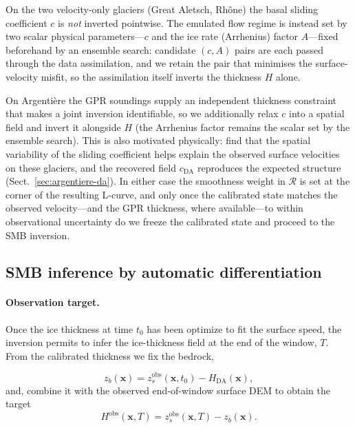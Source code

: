 On the two velocity-only glaciers (Great Aletsch, Rhône) the basal sliding
coefficient $c$ is \emph{not} inverted pointwise. The emulated flow regime is
instead set by two scalar physical parameters---$c$ and the ice rate (Arrhenius)
factor $A$---fixed beforehand by an ensemble search: candidate $(c, A)$ pairs are
each passed through the data assimilation, and we retain the pair that minimises the
surface-velocity misfit, so the assimilation itself inverts the thickness $H$ alone.

On Argentière the GPR soundings supply an independent thickness constraint that
makes a joint inversion identifiable, so we additionally relax $c$ into a spatial
field and invert it alongside $H$ (the Arrhenius factor remains the scalar set by
the ensemble search). This is also motivated physically: \citet{kneib2024} find that
the spatial variability of the sliding coefficient helps explain the observed
surface velocities on these glaciers, and the recovered field $c_{\mathrm{DA}}$
reproduces the expected structure (Sect.~\ref{sec:argentiere-da}). In either case
the smoothness weight in $\mathcal{R}$ is set at the corner of the resulting L-curve,
and only once the calibrated state matches the observed velocity---and the GPR
thickness, where available---to within observational uncertainty do we freeze the
calibrated state and proceed to the SMB inversion.

\subsection{SMB inference by automatic differentiation}\label{sec:inference}

\paragraph{Observation target.}
Once the ice thickness at time $t_0$ has been optimize to fit the surface speed, the inversion permits to infer the ice-thickness field at the
end of the window, $T$. From the calibrated thickness we fix the bedrock,

\begin{equation}
  z_b(\mathbf{x}) = z_s^{\mathrm{obs}}(\mathbf{x}, t_0) - H_{\mathrm{DA}}(\mathbf{x}),
  \label{eq:bed}
\end{equation}
and, combine it with the observed end-of-window surface DEM to obtain the
target
\begin{equation}
  H^{\mathrm{obs}}(\mathbf{x}, T) = z_s^{\mathrm{obs}}(\mathbf{x}, T) - z_b(\mathbf{x}).
  \label{eq:hobs}
\end{equation}

